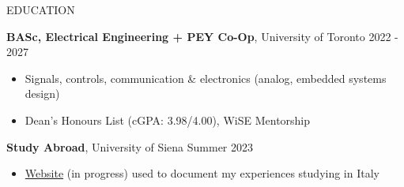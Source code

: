 \documentclass{resume}
\begin{document}



\begin{rSection}{EDUCATION}

    {\bf BASc, Electrical Engineering + PEY Co-Op}, University of Toronto \hfill {2022 - 2027}
    \vspace{-0.2cm}
    \begin{itemize}
     \itemsep -8pt {} 
      \item Signals, controls, communication \& electronics (analog, embedded systems design) 
      \item Dean's Honours List (cGPA: 3.98/4.00), WiSE Mentorship
    \end{itemize}

    {\bf Study Abroad}, University of Siena \hfill {Summer 2023}
    \vspace{-0.2cm}
    \begin{itemize}
     \itemsep -8pt {} 
      \item  \href{https://github.com/endothermiic/serendipity}{Website} (in progress) used to document my experiences studying in Italy 
    \end{itemize}


\end{rSection}
\end{document}
